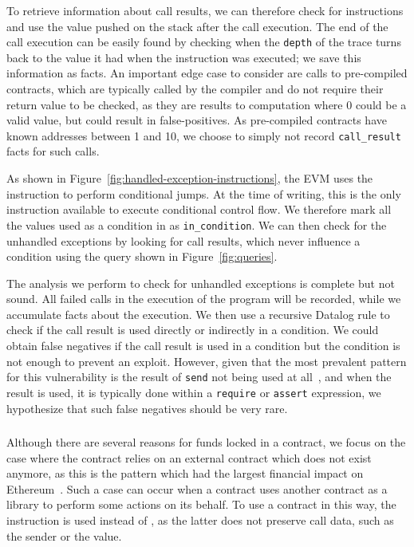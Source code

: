 To retrieve information about call results, we can therefore check for  instructions and use the value pushed on the stack after the call execution. The end of the call execution can be easily found by checking when the \lstinline{depth} of the trace turns back to the value it had when the  instruction was executed; we save this information as  facts.
An important edge case to consider are calls to pre-compiled contracts, which are typically called by the compiler and do not require their return value to be checked, as they are results to computation where $0$ could be a valid value, but could result in false-positives.
As pre-compiled contracts have known addresses between 1 and 10, we choose to simply not record \lstinline{call_result} facts for such calls.

As shown in Figure~\ref{fig:handled-exception-instructions}, the EVM uses the  instruction to perform conditional jumps. At the time of writing, this is the only instruction available to execute conditional control flow. We therefore mark all the values used as a condition in  as \lstinline{in_condition}. We can then check for the unhandled exceptions by looking for call results, which never influence a condition using the query shown in Figure~\ref{fig:queries}.

\correctness The analysis we perform to check for unhandled exceptions is complete but not sound.
All failed calls in the execution of the program will be recorded, while we accumulate facts about the execution.
We then use a recursive Datalog rule to check if the call result is used directly or indirectly in a condition.
We could obtain false negatives if the call result is used in a condition but the condition is not enough to prevent an exploit.
However, given that the most prevalent pattern for this vulnerability is the result of \lstinline{send} not being used at all~\cite{Tsankov2018}, and when the result is used, it is typically done within a \lstinline{require} or \lstinline{assert} expression, we hypothesize that such false negatives should be very rare.

\subsubsection{\lockedether}
Although there are several reasons for funds locked in a contract, we focus on the case where the contract relies on an external contract which does not exist anymore, as this is the pattern which had the largest financial impact on Ethereum~\cite{Breidenbach}. Such a case can occur when a contract uses another contract as a library to perform some actions on its behalf. To use a contract in this way, the  instruction is used instead of , as the latter does not preserve call data, such as the sender or the value.

